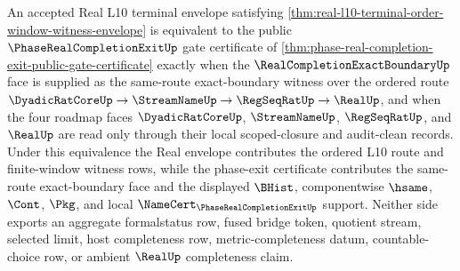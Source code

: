 \begin{theorem}
\label{thm:real-l10-terminal-envelope-phase-exit-equivalence}
An accepted Real L10 terminal envelope satisfying \autoref{thm:real-l10-terminal-order-window-witness-envelope} is equivalent to the public $\PhaseRealCompletionExitUp$ gate certificate of \autoref{thm:phase-real-completion-exit-public-gate-certificate} exactly when the $\RealCompletionExactBoundaryUp$ face is supplied as the same-route exact-boundary witness over the ordered route $\DyadicRatCoreUp \to \StreamNameUp \to \RegSeqRatUp \to \RealUp$, and when the four roadmap faces $\DyadicRatCoreUp$, $\StreamNameUp$, $\RegSeqRatUp$, and $\RealUp$ are read only through their local scoped-closure and audit-clean records. Under this equivalence the Real envelope contributes the ordered L10 route and finite-window witness rows, while the phase-exit certificate contributes the same-route exact-boundary face and the displayed $\BHist$, componentwise $\hsame$, $\Cont$, $\Pkg$, and local $\NameCert_{\PhaseRealCompletionExitUp}$ support. Neither side exports an aggregate formalstatus row, fused bridge token, quotient stream, selected limit, host completeness row, metric-completeness datum, countable-choice row, or ambient $\RealUp$ completeness claim.
\end{theorem}
